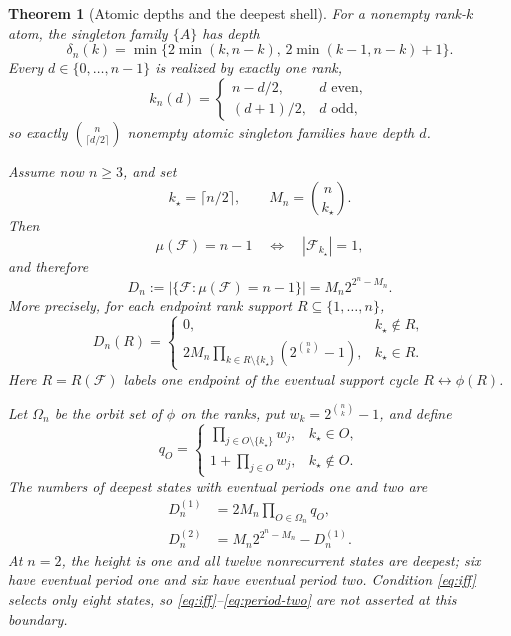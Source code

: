 \documentclass[a4paper,10pt]{amsart}
\newtheorem{theorem}{Theorem}
\newcommand{\cF}{\mathcal F}
\begin{document}
\begin{theorem}[Atomic depths and the deepest shell]\label{thm:deep}
For a nonempty rank-$k$ atom, the singleton family $\{A\}$ has depth
\begin{equation}\label{eq:delta}
 \delta_n(k)=\min\{2\min(k,n-k),\,2\min(k-1,n-k)+1\}.
\end{equation}
Every $d\in\{0,\ldots,n-1\}$ is realized by exactly one rank,
\begin{equation}\label{eq:rank-depth}
 k_n(d)=
 \begin{cases}n-d/2,&d\text{ even},\\(d+1)/2,&d\text{ odd},\end{cases}
\end{equation}
so exactly $\binom n{\lceil d/2\rceil}$ nonempty atomic singleton families
have depth $d$.

Assume now $n\geq3$, and set
\begin{equation}\label{eq:middle}
 k_\star=\lceil n/2\rceil,\qquad M_n=\binom n{k_\star}.
\end{equation}
Then
\begin{equation}\label{eq:iff}
 \mu(\cF)=n-1\quad\Longleftrightarrow\quad |\cF_{k_\star}|=1,
\end{equation}
and therefore
\begin{equation}\label{eq:deep-total}
 D_n:=|\{\cF:\mu(\cF)=n-1\}|=M_n2^{2^n-M_n}.
\end{equation}
More precisely, for each endpoint rank support
$R\subseteq\{1,\ldots,n\}$,
\begin{equation}\label{eq:deep-support}
 D_n(R)=
 \begin{cases}
 0,&k_\star\notin R,\\[2pt]
 \displaystyle 2M_n\prod_{k\in R\setminus\{k_\star\}}
   \left(2^{\binom nk}-1\right),&k_\star\in R.
 \end{cases}
\end{equation}
Here $R=R(\cF)$ labels one endpoint of the eventual support cycle
$R\leftrightarrow\phi(R)$.

Let $\Omega_n$ be the orbit set of $\phi$ on the ranks, put
$w_k=2^{\binom nk}-1$, and define
\begin{equation}\label{eq:qO}
 q_O=
 \begin{cases}
 \displaystyle\prod_{j\in O\setminus\{k_\star\}}w_j,&k_\star\in O,\\[6pt]
 \displaystyle1+\prod_{j\in O}w_j,&k_\star\notin O.
 \end{cases}
\end{equation}
The numbers of deepest states with eventual periods one and two are
\begin{align}
 D_n^{(1)}&=2M_n\prod_{O\in\Omega_n}q_O,\label{eq:period-one}\\
 D_n^{(2)}&=M_n2^{2^n-M_n}-D_n^{(1)}.\label{eq:period-two}
\end{align}
At $n=2$, the height is one and all twelve nonrecurrent states are deepest;
six have eventual period one and six have eventual period two.  Condition
\eqref{eq:iff} selects only eight states, so
\eqref{eq:iff}--\eqref{eq:period-two} are not asserted at this boundary.
\end{theorem}
\end{document}
